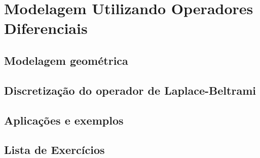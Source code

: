 \chapter{Modelagem Utilizando Operadores Diferenciais}\label{cap_mod_od}

\thispagestyle{empty}


\section{Modelagem geométrica}\label{LB_Int}


\section{Discretização do operador de Laplace-Beltrami}\label{LB_def}



\section{Aplicações e exemplos}\label{LB_matlab}


\section{Lista de Exercícios}\label{LB_ListaEx}


